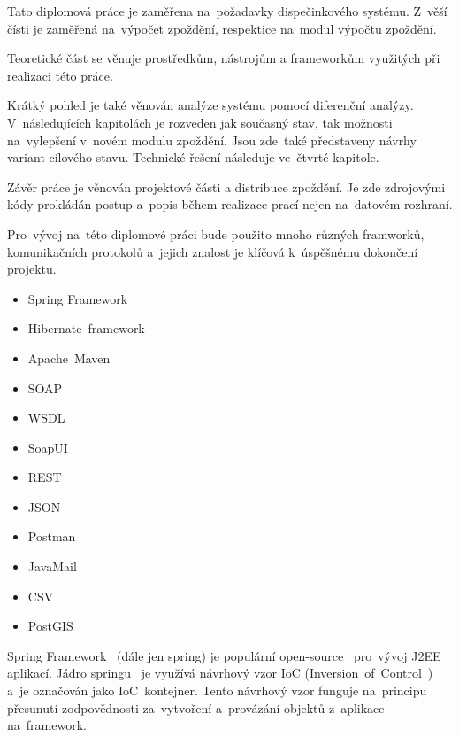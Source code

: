 
Tato diplomová práce je zaměřena na~požadavky dispečinkového systému. Z~věší čísti je zaměřená na~výpočet zpoždění, respektice na~modul výpočtu zpoždění.

Teoretické část se věnuje prostředkům, nástrojům a frameworkům využitých při realizaci této práce.

Krátký pohled je také věnován analýze systému pomocí diferenční analýzy. V~následujících kapitolách je rozveden jak současný stav, tak možnosti na~vylepšení v~novém modulu zpoždění. Jsou zde~také představeny návrhy variant cílového stavu. Technické řešení následuje ve~čtvrté kapitole.

Závěr práce je věnován projektové části a distribuce zpoždění. Je zde zdrojovými kódy prokládán postup a~popis během realizace prací nejen na~datovém rozhraní.



Pro~vývoj na~této diplomové práci bude použito mnoho různých framworků, komunikačních protokolů a~jejich znalost je klíčová k~úspěšnému dokončení projektu.  
\begin{itemize}
	\setlength{\parskip}{0pt}
	\setlength{\itemsep}{0pt}
	\item {Spring Framework}
	\item {Hibernate~framework}
	\item {Apache~Maven}
	\item {SOAP}
	\item {WSDL}
	\item {SoapUI}
	\item {REST}
	\item {JSON}
	\item {Postman}
	\item {JavaMail}
	\item {CSV}
	\item {PostGIS}
\end{itemize}
Spring Framework~\cite{spring-framework} (dále jen spring) je populární open-source~\cite{open-source} pro~vývoj J2EE~\cite{j2ee} aplikací. Jádro springu~\cite{spring-in-action} je využívá návrhový vzor IoC (Inversion~of~Control~\cite{ioc}) a~je označován jako IoC~kontejner. Tento návrhový vzor funguje na~principu přesunutí zodpovědnosti za~vytvoření a~provázání objektů z~aplikace na~framework.

